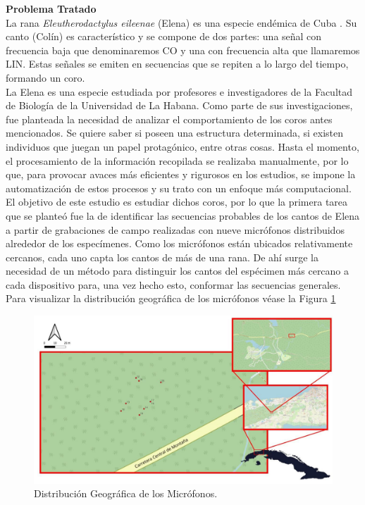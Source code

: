 \documentclass[a4paper,10pt,twocolumn]{article}
\begin{document}
\textbf{Problema Tratado}\\


La rana \textit{Eleutherodactylus eileenae} (Elena)  
es una especie endémica de Cuba \cite{elena}. 
Su canto (Colín) es característico y se compone de dos 
partes: una señal con frecuencia baja que 
denominaremos CO y una con frecuencia alta que 
llamaremos LIN. Estas señales se emiten en 
secuencias que se repiten a lo largo del tiempo, 
formando un coro.\\

La Elena es una especie estudiada por profesores e investigadores
de la Facultad de Biología de la Universidad de La Habana. Como parte de sus
investigaciones, fue planteada la necesidad de analizar el comportamiento de los 
coros antes mencionados. Se quiere saber si poseen una estructura determinada,
si existen individuos que juegan un papel protagónico, entre otras cosas. 
Hasta el momento, el procesamiento de la información recopilada se realizaba manualmente,
por lo que, para provocar avaces más eficientes y rigurosos en los estudios,
se impone la automatización de estos procesos y su trato con un enfoque más 
computacional.\\

El objetivo de este estudio es 
estudiar dichos coros, por lo que la primera tarea que se planteó fue la de
identificar las secuencias probables de los cantos de 
Elena a partir de grabaciones de campo realizadas con 
nueve micrófonos distribuidos alrededor de los 
especímenes. Como los micrófonos están ubicados
relativamente cercanos, cada uno capta los cantos de más de una rana. 
De ahí surge la necesidad de un método para distinguir los cantos
del espécimen más cercano a cada dispositivo para, una vez hecho esto, conformar
las secuencias generales. Para visualizar la distribución geográfica de los 
micrófonos véase la Figura \ref{fig:mics}

\begin{figure}[h!]
    \centering
    \includegraphics[width=\columnwidth]{assets/mic_map.jpg}
    \caption{Distribución Geográfica de los Micrófonos.}
    \label{fig:mics}
\end{figure}
\end{document}

